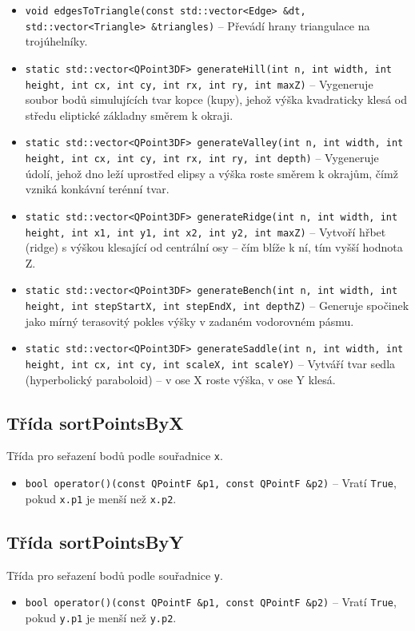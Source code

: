 \begin{itemize}
\item \texttt{void edgesToTriangle(const std::vector<Edge> \&dt, std::vector<Triangle> \&triangles)} – Převádí hrany triangulace na trojúhelníky.
\item \texttt{static std::vector<QPoint3DF> generateHill(int n, int width, int height, int cx, int cy, int rx, int ry, int maxZ)} – Vygeneruje soubor bodů simulujících tvar kopce (kupy), jehož výška kvadraticky klesá od středu eliptické základny směrem k okraji.
\item \texttt{static std::vector<QPoint3DF> generateValley(int n, int width, int height, int cx, int cy, int rx, int ry, int depth)} – Vygeneruje údolí, jehož dno leží uprostřed elipsy a výška roste směrem k okrajům, čímž vzniká konkávní terénní tvar.
\item \texttt{static std::vector<QPoint3DF> generateRidge(int n, int width, int height, int x1, int y1, int x2, int y2, int maxZ)} – Vytvoří hřbet (ridge) s výškou klesající od centrální osy – čím blíže k ní, tím vyšší hodnota Z.
\item \texttt{static std::vector<QPoint3DF> generateBench(int n, int width, int height, int stepStartX, int stepEndX, int depthZ)} – Generuje spočinek jako mírný terasovitý pokles výšky v zadaném vodorovném pásmu.
\item \texttt{static std::vector<QPoint3DF> generateSaddle(int n, int width, int height, int cx, int cy, int scaleX, int scaleY)} – Vytváří tvar sedla (hyperbolický paraboloid) – v ose X roste výška, v ose Y klesá.

\end{itemize}

\subsection{Třída sortPointsByX}
Třída pro seřazení bodů podle souřadnice \texttt{x}.
\begin{itemize}
    \item \texttt{bool  operator()(const QPointF \&p1, const QPointF \&p2)} – Vratí \texttt{True}, pokud \texttt{x.p1} je menší než \texttt{x.p2}.
\end{itemize}

\subsection{Třída sortPointsByY}
Třída pro seřazení bodů podle souřadnice \texttt{y}.
\begin{itemize}
    \item \texttt{bool  operator()(const QPointF \&p1, const QPointF \&p2)} – Vratí \texttt{True}, pokud \texttt{y.p1} je menší než \texttt{y.p2}.
\end{itemize}

